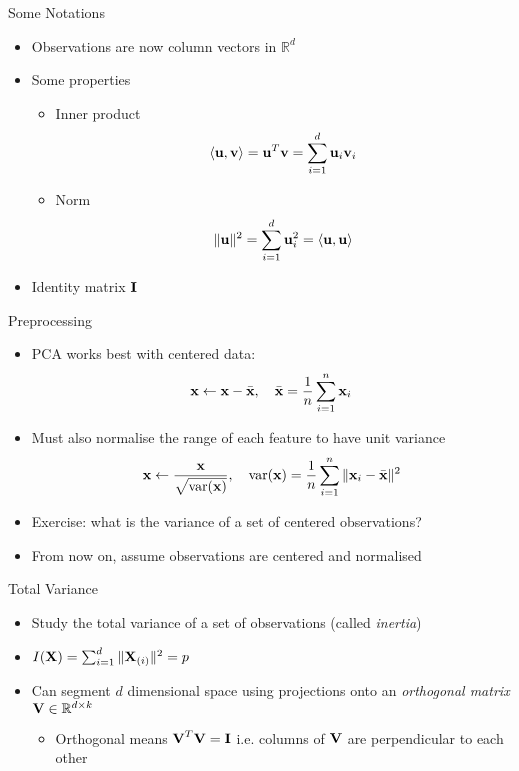 \documentclass{beamer}
\begin{document}
\begin{frame}{Some Notations}
\begin{itemize} 
 \item Observations are now column vectors in $\mathbb{R}^d$
 \item Some properties 
 \begin{itemize}
 \item Inner product 
 \begin{displaymath} 
  \langle \textbf{u}, \textbf{v} \rangle = \textbf{u}^T\textbf{v} = \sum_{i=1}^d \textbf{u}_i \textbf{v}_i
 \end{displaymath}
 \item Norm 
 \begin{displaymath} 
  \|\textbf{u}\|^2 = \sum_{i=1}^d \textbf{u}_i^2 = \langle \textbf{u}, \textbf{u} \rangle
 \end{displaymath}
 \end{itemize} 
 \item Identity matrix $\textbf{I}$
\end{itemize}
\end{frame}


\begin{frame}{Preprocessing} 
\begin{itemize} 
 \item PCA works best with centered data: 
 \begin{displaymath} 
  \textbf{x} \leftarrow \textbf{x} - \bar{\textbf{x}}, \quad  \bar{\textbf{x}} = \frac{1}{n}\sum_{i=1}^n \textbf{x}_i
 \end{displaymath}
\item Must also normalise the range of each feature to have unit variance 
\begin{displaymath}
 \textbf{x} \leftarrow \frac{\textbf{x}}{\sqrt{\mbox{var}(\textbf{x})}}, \quad \mbox{var}(\textbf{x}) = \frac{1}{n}\sum_{i=1}^n \|\textbf{x}_i - \bar{\textbf{x}}\|^2
\end{displaymath}
\item Exercise: what is the variance of a set of centered observations? 
\item From now on, assume observations are centered and normalised 
\end{itemize}
\end{frame}

\begin{frame}{Total Variance} 
\begin{itemize} 
 \item Study the total variance of a set of observations (called \emph{inertia})
 \item $I(\textbf{X}) = \sum_{i=1}^d \|\textbf{X}_{(i)}\|^2 = p$
 \item Can segment $d$ dimensional space using projections onto an \emph{orthogonal matrix} $\textbf{V} \in \mathbb{R}^{d \times k}$ 
 \begin{itemize}
  \item Orthogonal means $\textbf{V}^T\textbf{V} = \textbf{I}$ i.e. columns of $\textbf{V}$ are perpendicular to each other
 \end{itemize}
\end{itemize}
\end{frame}
\end{document}

